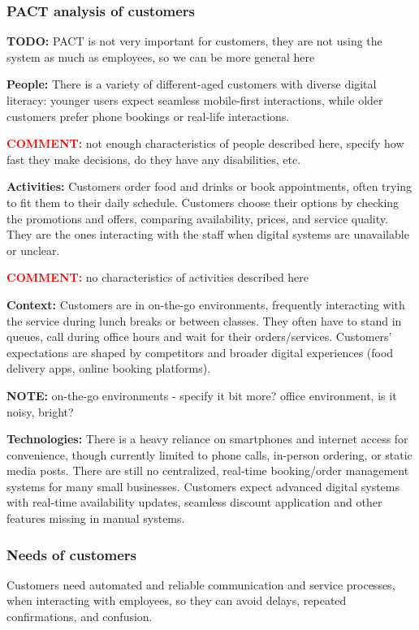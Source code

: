 \documentclass[]{VUMIFTemplateClass}
\newcommand{\yellowcomment}[1]{%
    \begin{tcolorbox}[colback=yellow!80, colframe=yellow!80, arc=0pt, outer arc=0pt, boxrule=0pt, left=3pt, right=3pt, top=3pt, bottom=3pt]
        \textbf{\textcolor{red}{COMMENT:}} #1
    \end{tcolorbox}
}
\newcommand{\noticecomment}[1]{%
    \begin{tcolorbox}[colback=blue!20, colframe=blue!60, arc=0pt, outer arc=0pt, boxrule=1pt, left=3pt, right=3pt, top=3pt, bottom=3pt]
        \textbf{\textcolor{blue!70!black}{NOTE:}} #1
    \end{tcolorbox}
}
\newcommand{\todocomment}[1]{%
    \begin{tcolorbox}[colback=red!20, colframe=red!60, arc=0pt, outer arc=0pt, boxrule=1pt, left=3pt, right=3pt, top=3pt, bottom=3pt]
        \textbf{\textcolor{orange!70!black}{TODO:}} #1
    \end{tcolorbox}
}
\begin{document}
\subsubsection{PACT analysis of customers}
\todocomment{PACT is not very important for customers, they are not using the system as much as employees, so we can be more general here}
\textbf{People:} There is a variety of different-aged customers with diverse
digital literacy: younger users expect seamless mobile-first interactions, while
older customers prefer phone bookings or real-life interactions. 
\yellowcomment{not enough characteristics of people described here, specify how fast they make decisions, do they have any disabilities, etc. }

\textbf{Activities:} Customers order food and drinks or book appointments, often
trying to fit them to their daily schedule. Customers choose their options by
checking the promotions and offers, comparing availability, prices, and service
quality. They are the ones interacting with the staff when digital systems are
unavailable or unclear.

\yellowcomment{no characteristics of activities described here}

\textbf{Context:} Customers are in on-the-go environments, frequently
interacting with the service during lunch breaks or between classes. They often
have to stand in queues, call during office hours and wait for their
orders/services. Customers' expectations are shaped by competitors and broader
digital experiences (food delivery apps, online booking platforms).

\noticecomment{on-the-go environments - specify it bit more? office environment, is it noisy, bright?}

\textbf{Technologies:} There is a heavy reliance on smartphones and internet
access for convenience, though currently limited to phone calls, in-person
ordering, or static media posts. There are still no centralized, real-time
booking/order management systems for many small businesses. Customers expect
advanced digital systems with real-time availability updates, seamless discount
application and other features missing in manual systems.

\subsubsection{Needs of customers}
Customers need automated and reliable communication and service processes, when interacting with employees, so they can avoid delays, repeated confirmations, and confusion.
\end{document}

